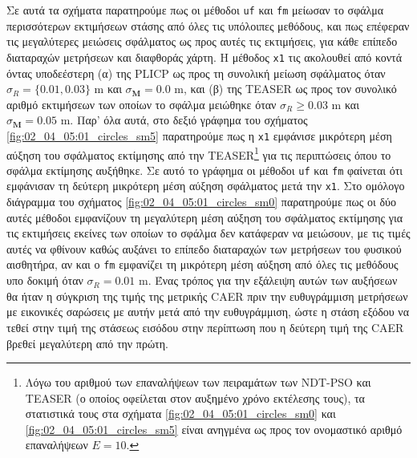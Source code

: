 Σε αυτά τα σχήματα παρατηρούμε πως οι μέθοδοι \texttt{uf} και \texttt{fm}
μείωσαν το σφάλμα περισσότερων εκτιμήσεων στάσης από όλες τις υπόλοιπες
μεθόδους, και πως επέφεραν τις μεγαλύτερες μειώσεις σφάλματος ως προς αυτές τις
εκτιμήσεις, για κάθε επίπεδο διαταραχών μετρήσεων και διαφθοράς χάρτη. Η
μέθοδος \texttt{x1} τις ακολουθεί από κοντά όντας υποδεέστερη (α) της PLICP ως
προς τη συνολική μείωση σφάλματος όταν $\sigma_R = \{0.01, 0.03\}$ m και
$\sigma_{\bm{M}} = 0.0$ m, και (β) της TEASER ως προς τον συνολικό αριθμό
εκτιμήσεων των οποίων το σφάλμα μειώθηκε όταν $\sigma_R \geq 0.03$ m και
$\sigma_{\bm{M}} = 0.05$ m. Παρ' όλα αυτά, στο δεξιό γράφημα του σχήματος
\ref{fig:02_04_05:01_circles_sm5} παρατηρούμε πως η \texttt{x1} εμφάνισε
μικρότερη μέση αύξηση του σφάλματος εκτίμησης από την TEASER\footnote{Λόγω του
αριθμού των επαναλήψεων των πειραμάτων των NDT-PSO και TEASER (ο οποίος
οφείλεται στον αυξημένο χρόνο εκτέλεσης τους), τα στατιστικά τους στα σχήματα
\ref{fig:02_04_05:01_circles_sm0} και \ref{fig:02_04_05:01_circles_sm5} είναι
ανηγμένα ως προς τον ονομαστικό αριθμό επαναλήψεων $E=10$.} για τις περιπτώσεις
όπου το σφάλμα εκτίμησης αυξήθηκε. Σε αυτό το γράφημα οι μέθοδοι \texttt{uf}
και \texttt{fm} φαίνεται ότι εμφάνισαν τη δεύτερη μικρότερη μέση αύξηση
σφάλματος μετά την \texttt{x1}. Στο ομόλογο διάγραμμα του σχήματος
\ref{fig:02_04_05:01_circles_sm0} παρατηρούμε πως οι δύο αυτές μέθοδοι
εμφανίζουν τη μεγαλύτερη μέση αύξηση του σφάλματος εκτίμησης για τις εκτιμήσεις
εκείνες των οποίων το σφάλμα δεν κατάφεραν να μειώσουν, με τις τιμές αυτές να
φθίνουν καθώς αυξάνει το επίπεδο διαταραχών των μετρήσεων του φυσικού
αισθητήρα, αν και ο \texttt{fm} εμφανίζει τη μικρότερη μέση αύξηση από όλες τις
μεθόδους υπο δοκιμή όταν $\sigma_R = 0.01$ m. Ένας τρόπος για την εξάλειψη
αυτών των αυξήσεων θα ήταν η σύγκριση της τιμής της μετρικής CAER πριν την
ευθυγράμμιση μετρήσεων με εικονικές σαρώσεις με αυτήν μετά από την
ευθυγράμμιση, ώστε η στάση εξόδου να τεθεί στην τιμή της στάσεως εισόδου στην
περίπτωση που η δεύτερη τιμή της CAER βρεθεί μεγαλύτερη από την πρώτη.

